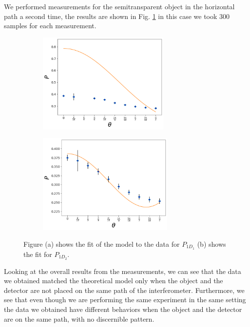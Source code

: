 \documentclass[12pt]{book}
\begin{document}
We performed measurements for the semitransparent object in the horizontal path a second time, the results are shown in Fig. \ref{segundass} in this case we took 300 samples for each measurement.

\begin{figure}[t!]
\centering
\begin{subfigure}[b]{0.45\linewidth}
\includegraphics[width=\linewidth,height=5cm]{images/ajuste_jueves_11_50:50.png}
\caption{}
\end{subfigure}
\begin{subfigure}[b]{0.45\linewidth}
\includegraphics[width=\linewidth,height=5cm]{images/ajuste_jueves_21_50:50.png}
\caption{}
\end{subfigure}
\caption{Figure (a) shows the fit of the model to the data for $P_{1D_{1}}$ (b) shows the fit for $P_{1D_{2}}$.}
\label{segundass}
\end{figure}


Looking at the overall results from the measurements, we can see that the data we obtained matched the theoretical model only when the object and the detector are not placed on the same path of the interferometer. Furthermore, we see that even though we are performing the same experiment in the same setting the data we obtained have different behaviors when the object and the detector are on the same path, with no discernible pattern. 
\end{document}
